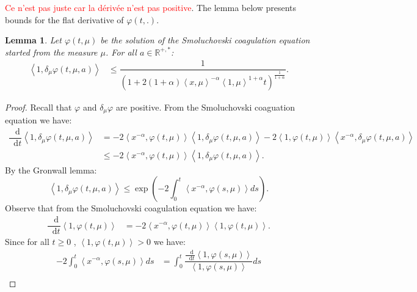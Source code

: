 \documentclass[11pt,a4paper]{article}
\newcommand{\RR}{\mathbb{R}}
\newcommand{\red}[1]{\textcolor{red}{#1}}
\newcommand{\dd}{\mathop{}\!\mathrm{d}}
\newtheorem{lemma}[theorem]{Lemma}
\begin{document}
\red{Ce n'est pas juste car la dérivée n'est pas positive}. The lemma below presents bounds for the flat derivative of $\varphi(t,.)$.
\begin{lemma}
Let $\varphi\left(t,\mu\right)$ be the solution of the Smoluchovski coagulation equation started from the measure $\mu$. For all $a \in \RR^{+,*}$:
    \begin{align*}
        \left\langle 1, \delta_\mu\varphi\left(t,\mu,a\right) \right\rangle &\leq \dfrac{1}{\left(1 + 2(1 + \alpha)\left\langle x, \mu \right\rangle^{-\alpha} \left\langle 1, \mu \right\rangle^{1 + \alpha} t \right)^{\frac{1}{1 + \alpha}}}.
    \end{align*}
\end{lemma}
\begin{proof}
    Recall that $\varphi$ and $\delta_\mu \varphi$ are positive. From the Smoluchovski coaguation equation we have:
    \begin{align*}
        \dfrac{\dd}{\dd t} \left\langle 1, \delta_\mu\varphi\left(t,\mu,a\right)\right\rangle
        &= -2\left\langle x^{-\alpha} , \varphi\left(t,\mu\right)\right\rangle \left\langle 1, \delta_\mu\varphi\left(t,\mu,a\right)\right\rangle
        - 2\left\langle 1 , \varphi\left(t,\mu\right)\right\rangle \left\langle x^{-\alpha}, \delta_\mu\varphi\left(t,\mu,a\right)\right\rangle \\
        &\leq -2\left\langle x^{-\alpha} , \varphi\left(t,\mu\right)\right\rangle \left\langle 1, \delta_\mu\varphi\left(t,\mu,a\right)\right\rangle.
    \end{align*}
    By the Gronwall lemma:
    \begin{equation}\label{eq:proof_bounf_smol_d1_gronwall}
        \left\langle 1, \delta_\mu\varphi\left(t,\mu,a\right)\right\rangle \leq \exp{\left(-2\int_0^t \left\langle x^{-\alpha} , \varphi\left(s,\mu\right)\right\rangle ds\right)}.
    \end{equation}
    Observe that from the Smoluchovski coagulation equation we have:
    \begin{align*}
        \dfrac{\dd}{\dd t} \left\langle 1, \varphi\left(t,\mu\right)\right\rangle &= -2\left\langle x^{-\alpha} , \varphi\left(t,\mu\right)\right\rangle \left\langle 1 , \varphi\left(t,\mu\right)\right\rangle.
    \end{align*}
    Since for all $t \geq 0$ , $\left\langle 1 , \varphi\left(t,\mu\right)\right\rangle > 0$ we have:
    \begin{align*}
        -2\int_0^t \left\langle x^{-\alpha} , \varphi\left(s,\mu\right)\right\rangle ds &= \int_0^t \dfrac{\frac{\dd}{\dd t} \left\langle 1, \varphi\left(s,\mu\right)\right\rangle}{\left\langle 1, \varphi\left(s,\mu\right)\right\rangle} ds\\

\end{align*}
\end{proof}
\end{document}
